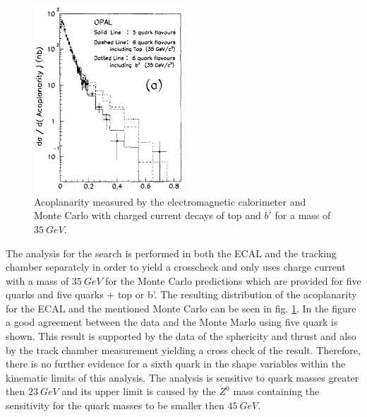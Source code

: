 \documentclass[11pt, twocolumn, a4paper]{article}
\begin{document}
\FloatBarrier
\begin{figure}[h!]
	\centering
	\includegraphics[width=0.5\textwidth]{plot.png}
	\caption{Acoplanarity measured by the electromagnetic calorimeter and Monte Carlo with charged current decays of top and $b'$ for a mass of $\SI{35}{GeV}$.\cite{paper}}
	\label{fig:aco}
\end{figure}
The analysis for the search is performed in both the ECAL and the tracking chamber separately in order to yield a crosscheck and only uses charge current with a mass of $\SI{35}{GeV}$ for the Monte Carlo predictions which are provided for five quarks and five quarks + top or b'.
The resulting distribution of the acoplanarity for the ECAL and the mentioned Monte Carlo can be seen in fig. \ref{fig:aco}.
In the figure a good agreement between the data and the Monte Marlo using five quark is shown.
This result is supported by the data of the sphericity and thrust and also by the track chamber measurement yielding a cross check of the result.
Therefore, there is no further evidence for a sixth quark in the shape variables within the kinematic limits of this analysis.
The analysis is sensitive to quark masses greater then $\SI{23}{GeV}$ and its upper limit is caused by the $Z^0$ mass containing the sensitivity for the quark masses to be smaller then $\SI{45}{GeV}$. \\
\end{document}
